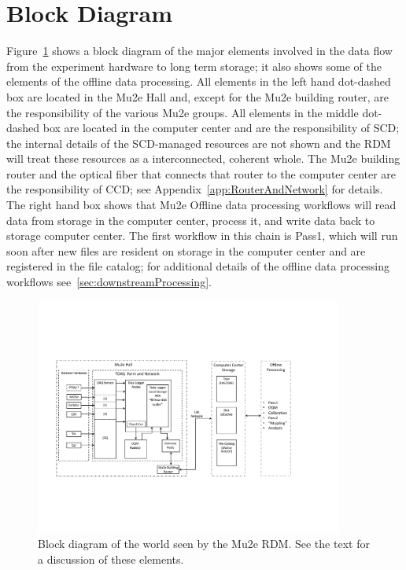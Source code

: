 \section{Block Diagram}
\label{sec:BlockDiagram}

Figure~\ref{fig:blockdiagram} shows a block diagram of the major elements involved
in the data flow from the experiment hardware to long term storage; it also shows
some of the elements of the offline data processing.
All elements in the left hand dot-dashed box are located in the Mu2e Hall
and, except for the Mu2e building router, are the responsibility of the various Mu2e groups.
All elements in the middle dot-dashed box are located in the computer center
and are the responsibility of SCD; the internal details of the SCD-managed resources
are not shown and the RDM will treat these resources as a interconnected, coherent whole.
The Mu2e building router and the optical fiber that connects that router
to the computer center are the responsibility of CCD;
see Appendix~\ref{app:RouterAndNetwork} for details.
The right hand box shows that Mu2e Offline data processing workflows
will read data from storage in the computer center,
process it,
and write data back to storage computer center.
The first workflow in this chain is Pass1, which will run soon after new files
are resident on storage in the computer center and are registered in the file catalog;
for additional details of the offline data processing workflows see~\ref{sec:downstreamProcessing}.

\begin{figure}[tbp]
\centering
\includegraphics[width=0.9\textwidth]{figures/interface_with_TDAQ.pdf}
\caption[Block diagram of interfaces seen by the Mu2e RDM]{
  Block diagram of the world seen by the Mu2e RDM.
  See the text for a discussion of these elements.}
\label{fig:blockdiagram}
\end{figure}

